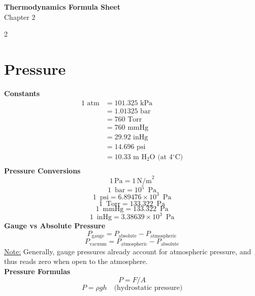 \documentclass[10pt, fleqn]{article}
\begin{document}
\begin{center}
    \Large \textbf{Thermodynamics Formula Sheet} \\
    \normalsize Chapter 2
\end{center}

\begin{multicols}{2}

\section*{Pressure}
\textbf{Constants}
\[\begin{aligned}
1 \text{ atm} &= 101.325 \text{ kPa} \\
&= 1.01325 \text{ bar} \\
&= 760 \text{ Torr} \\
&= 760 \text{ mmHg} \\
&= 29.92 \text{ inHg} \\
&= 14.696 \text{ psi}\\
&= 10.33 \text{ m H}_2\text{O (at 4$^\circ$C)} \\
\end{aligned}\]
\textbf{Pressure Conversions}
\[1\,\text{Pa} = 1\,\text{N/m}^2\]
\[1\, \text{ bar} = 10^{5}\, \text{ Pa}\]
\[1\, \text{ psi} = 6.89476 \times 10^{3}\, \text{ Pa}\]
\[1\, \text{ Torr} = 133.322\, \text{ Pa}\]
\[1\, \text{ mmHg} = 133.322\, \text{ Pa}\]
\[1\, \text{ inHg} = 3.38639 \times 10^{3}\, \text{ Pa}\]
\textbf{Gauge vs Absolute Pressure}
\[P_{\text{gauge}} = P_{\text{absolute}} - P_{\text{atmospheric}}\]
\[P_{\text{vacuum}} = P_{\text{atmospheric}} - P_{\text{absolute}}\]
\underline{Note:} Generally, gauge pressures already account for atmospheric pressure, and thus reads zero when open to the atmosphere.\\
\textbf{Pressure Formulas}
\[P=F/A\]
\[P = \rho g h\quad \text{(hydrostatic pressure)}\]

\end{multicols}
\end{document}
